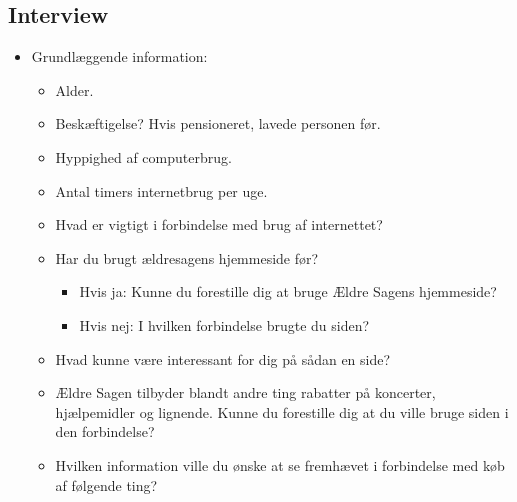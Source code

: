 



\maketitle

\tableofcontents


\thispagestyle{empty}









\renewcommand{\appendixtocname}{Bilag}
\renewcommand{\appendixpagename}{Bilag}
\begin{appendices}
    \section{Interview}
    \label{b:interview}
    \begin{itemize}
    \item Grundlæggende information:
    \begin{itemize}
        \item Alder.
        \item Beskæftigelse? Hvis pensioneret, lavede personen før.
        \item Hyppighed af computerbrug.
        \item Antal timers internetbrug per uge.
        \item Hvad er vigtigt i forbindelse med brug af internettet?
        \item Har du brugt ældresagens hjemmeside før?
        \begin{itemize}
            \item Hvis ja: Kunne du forestille dig at bruge Ældre Sagens hjemmeside?
            \item Hvis nej: I hvilken forbindelse brugte du siden?
        \end{itemize}
        \item Hvad kunne være interessant for dig på sådan en side?
        \item Ældre Sagen tilbyder blandt andre ting rabatter på koncerter, hjælpemidler og lignende. Kunne du forestille dig at du ville bruge siden i den forbindelse?
        \item Hvilken information ville du ønske at se fremhævet i forbindelse med køb af følgende ting?

\end{itemize}
\end{itemize}
\end{appendices}
